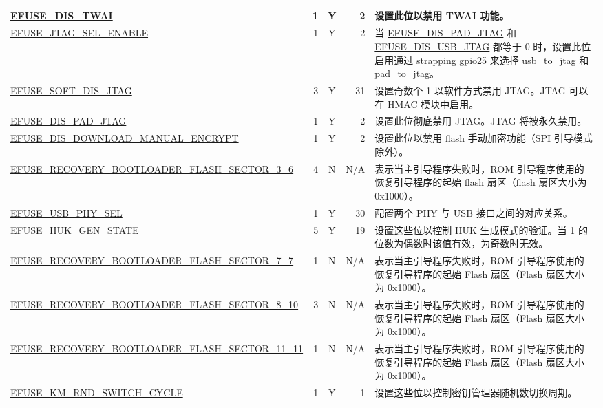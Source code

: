\begin{longtable}[l]{ |m{8.2cm}|r|c|r|m{9cm}| }
    \hyperref[fielddesc:EFUSEDISTWAI]{EFUSE\_DIS\_TWAI} & 1 & Y & 2 & 设置此位以禁用 TWAI 功能。 \\ \hline
    \hyperref[fielddesc:EFUSEJTAGSELENABLE]{EFUSE\_JTAG\_SEL\_ENABLE} & 1 & Y & 2 & 当 \hyperref[fielddesc:EFUSEDISPADJTAG]{EFUSE\_DIS\_PAD\_JTAG} 和 \hyperref[fielddesc:EFUSEDISUSBJTAG]{EFUSE\_DIS\_USB\_JTAG} 都等于 0 时，设置此位启用通过 strapping gpio25 来选择 usb\_to\_jtag 和 pad\_to\_jtag。 \\ \hline
    \hyperref[fielddesc:EFUSESOFTDISJTAG]{EFUSE\_SOFT\_DIS\_JTAG} & 3 & Y & 31 & 设置奇数个 1 以软件方式禁用 JTAG。JTAG 可以在 HMAC 模块中启用。 \\ \hline
    \hyperref[fielddesc:EFUSEDISPADJTAG]{EFUSE\_DIS\_PAD\_JTAG} & 1 & Y & 2 & 设置此位彻底禁用 JTAG。JTAG 将被永久禁用。 \\ \hline
    \hyperref[fielddesc:EFUSEDISDOWNLOADMANUALENCRYPT]{EFUSE\_DIS\_DOWNLOAD\_MANUAL\_ENCRYPT} & 1 & Y & 2 & 设置此位以禁用 flash 手动加密功能（SPI 引导模式除外）。 \\ \hline
    \hyperref[fielddesc:EFUSERECOVERYBOOTLOADERFLASHSECTOR36]{EFUSE\_RECOVERY\_BOOTLOADER\_FLASH\_\-SECTOR\_3\_6} & 4 & N & N/A & 表示当主引导程序失败时，ROM 引导程序使用的恢复引导程序的起始 flash 扇区（flash 扇区大小为 0x1000）。\\ \hline
    \hyperref[fielddesc:EFUSEUSBPHYSEL]{EFUSE\_USB\_PHY\_SEL} & 1 & Y & 30 & 配置两个 PHY 与 USB 接口之间的对应关系。\\ \hline
    \hyperref[fielddesc:EFUSEHUKGENSTATE]{EFUSE\_HUK\_GEN\_STATE} & 5 & Y & 19 & 设置这些位以控制 HUK 生成模式的验证。当 1 的位数为偶数时该值有效，为奇数时无效。 
\\ \hline
    \hyperref[fielddesc:EFUSERECOVERYBOOTLOADERFLASHSECTOR77]{EFUSE\_RECOVERY\_BOOTLOADER\_FLASH\_\-SECTOR\_7\_7} & 1 & N & N/A & 表示当主引导程序失败时，ROM 引导程序使用的恢复引导程序的起始 Flash 扇区（Flash 扇区大小为 0x1000）。  \\ \hline
    \hyperref[fielddesc:EFUSERECOVERYBOOTLOADERFLASHSECTOR810]{EFUSE\_RECOVERY\_BOOTLOADER\_FLASH\_\-SECTOR\_8\_10} & 3 & N & N/A & 表示当主引导程序失败时，ROM 引导程序使用的恢复引导程序的起始 Flash 扇区（Flash 扇区大小为 0x1000）。  \\ \hline
    \hyperref[fielddesc:EFUSERECOVERYBOOTLOADERFLASHSECTOR1111]{EFUSE\_RECOVERY\_BOOTLOADER\_FLASH\_\-SECTOR\_11\_11} & 1 & N & N/A & 表示当主引导程序失败时，ROM 引导程序使用的恢复引导程序的起始 Flash 扇区（Flash 扇区大小为 0x1000）。  \\ \hline
    \hyperref[fielddesc:EFUSEKMRNDSWITCHCYCLE]{EFUSE\_KM\_RND\_SWITCH\_CYCLE} & 1 & Y & 1 & 设置这些位以控制密钥管理器随机数切换周期。\\ \hline

\end{longtable}

